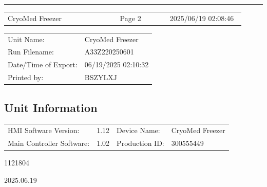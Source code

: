\documentclass[UTF8,10pt,a4paper,fontset=fandol]{ctexart}
\newcommand{\fieldvalue}[1]{#1}
\newcommand{\handwritten}[1]{#1}
\begin{document}
\vfill

\noindent\rule{\linewidth}{0.4pt}

\noindent
\begin{tabular}{p{0.45\linewidth} p{0.2\linewidth} p{0.3\linewidth}}
CryoMed Freezer & Page 2 & 2025/06/19 02:08:46
\end{tabular}

\newpage

\noindent
\begin{tabular}{@{}ll@{}}
Unit Name: &
\fieldvalue{CryoMed Freezer} \\[2pt]
Run Filename: &
\fieldvalue{A33Z220250601} \\[2pt]
Date/Time of Export: &
\fieldvalue{06/19/2025 02:10:32} \\[2pt]
Printed by: &
\fieldvalue{BSZYLXJ}
\end{tabular}

\subsection*{Unit Information}

\noindent
\begin{tabular}{@{}ll@{\qquad}ll@{}}
HMI Software Version: &
\fieldvalue{1.12}
&
Device Name: &
\fieldvalue{CryoMed Freezer}
\\[2pt]
Main Controller Software: &
\fieldvalue{1.02}
&
Production ID: &
\fieldvalue{300555449}
\end{tabular}

\handwritten{1121804}

\handwritten{2025.06.19}

\vspace{6pt}
\end{document}
